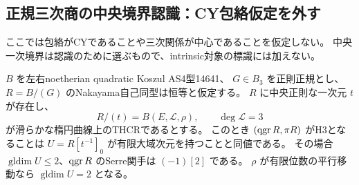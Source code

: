 \subsection{正規三次商の中央境界認識：CY包絡仮定を外す}
\label{subsec:normal-cubic-central-boundary}
ここでは包絡がCYであることや三次関係が中心であることを仮定しない。
中央一次境界は認識のために選ぶもので、intrinsic対象の標識には加えない。

\begin{theorem}[中央楕円境界を持つ正規三次商のH3認識]
\label{thm:normal-cubic-central-boundary-recognition}
$B$ を左右noetherian quadratic Koszul AS4型14641、
$G\in B_3$ を正則正規とし、$R=B/(G)$ のNakayama自己同型は恒等と仮定する。
$R$ に中央正則な一次元 $t$ が存在し、
\[
 R/(t)=B(E,\mathcal L,\rho),\qquad \deg\mathcal L=3
\]
が滑らかな楕円曲線上のTHCRであるとする。
このとき $(\operatorname{qgr} R,\pi R)$ がH3となることは
$U=R[t^{-1}]_0$ が有限大域次元を持つことと同値である。
その場合 $\operatorname{gldim}U\le2$、$\operatorname{qgr} R$ のSerre関手は $(-1)[2]$ である。
$\rho$ が有限位数の平行移動なら $\operatorname{gldim}U=2$ となる。
\end{theorem}
